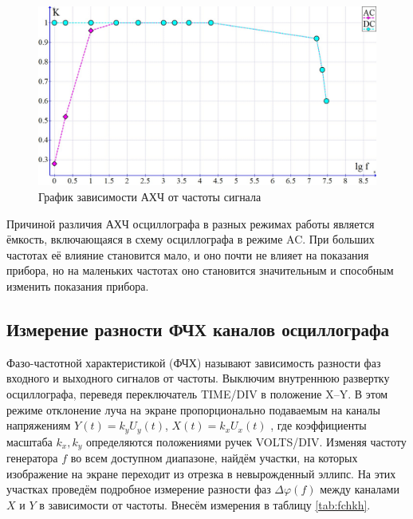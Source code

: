 \documentclass[a4paper,12pt]{article} %
\begin{document}
\begin{figure}[H]
	\includegraphics[scale=0.388]{ahch_graph.jpg}
	\caption{График зависимости АХЧ от частоты сигнала}
	\label{ahch_graph}
\end{figure}

Причиной различия АХЧ осциллографа в разных режимах работы является ёмкость, включающаяся в схему осциллографа в режиме AC. При больших частотах её влияние становится мало, и оно почти не влияет на показания прибора, но на маленьких частотах оно становится значительным и способным изменить показания прибора.

\subsection{Измерение разности ФЧХ каналов осциллографа}

Фазо-частотной характеристикой (ФЧХ) называют зависимость разности
фаз входного и выходного сигналов от частоты.
Выключим внутреннюю развертку осциллографа, переведя переключатель
TIME/DIV в положение X–Y. В этом режиме отклонение луча на экране
пропорционально подаваемым на каналы напряжениям $ Y\left(t\right)= k_yU_y\left(t\right) $,
$ X\left(t\right) = k_xU_x\left(t\right) $ , где коэффициенты масштаба $ k_x, k_y $ определяются
положениями ручек VOLTS/DIV. Изменяя частоту генератора $ f $ во всем
доступном диапазоне, найдём участки, на которых изображение на экране
переходит из отрезка в невырожденный эллипс. На этих участках проведём
подробное измерение разности фаз $ \Delta \varphi\left(f\right) $ между каналами $ X $ и $ Y $ в
зависимости от частоты. Внесём измерения в таблицу \ref{tab:fchkh}.
\end{document}
